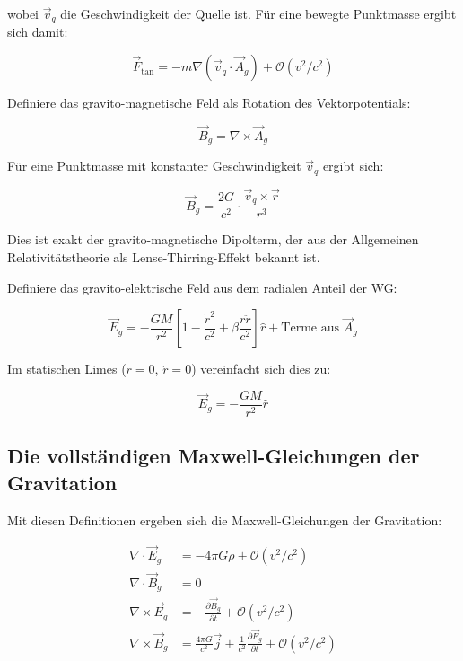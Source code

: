 \documentclass[12pt,a4paper]{article}
\begin{document}
wobei $\vec{v}_q$ die Geschwindigkeit der Quelle ist. Für eine bewegte Punktmasse ergibt sich damit:

\begin{equation}
\vec{F}_{\text{tan}} = -m \nabla (\vec{v}_q \cdot \vec{A}_g) + \mathcal{O}(v^2/c^2)
\end{equation}

Definiere das gravito-magnetische Feld als Rotation des Vektorpotentials:

\begin{equation}
\vec{B}_g = \nabla \times \vec{A}_g
\end{equation}

Für eine Punktmasse mit konstanter Geschwindigkeit $\vec{v}_q$ ergibt sich:

\begin{equation}
\vec{B}_g = \frac{2G}{c^2} \cdot \frac{\vec{v}_q \times \vec{r}}{r^3}
\end{equation}

Dies ist exakt der gravito-magnetische Dipolterm, der aus der Allgemeinen Relativitätstheorie als Lense-Thirring-Effekt bekannt ist.

Definiere das gravito-elektrische Feld aus dem radialen Anteil der WG:

\begin{equation}
\vec{E}_g = -\frac{GM}{r^2} \left[ 1 - \frac{\dot{r}^2}{c^2} + \beta \frac{r \ddot{r}}{c^2} \right] \hat{r} + \text{Terme aus } \vec{A}_g
\end{equation}

Im statischen Limes ($\dot{r} = 0$, $\ddot{r} = 0$) vereinfacht sich dies zu:

\begin{equation}
\vec{E}_g = -\frac{GM}{r^2} \hat{r}
\end{equation}

\subsection{Die vollständigen Maxwell-Gleichungen der Gravitation}

Mit diesen Definitionen ergeben sich die Maxwell-Gleichungen der Gravitation:

\begin{align}
\nabla \cdot \vec{E}_g &= -4\pi G\rho + \mathcal{O}(v^2/c^2) \\
\nabla \cdot \vec{B}_g &= 0 \\
\nabla \times \vec{E}_g &= -\frac{\partial \vec{B}_g}{\partial t} + \mathcal{O}(v^2/c^2) \\
\nabla \times \vec{B}_g &= \frac{4\pi G}{c^2} \vec{j} + \frac{1}{c^2} \frac{\partial \vec{E}_g}{\partial t} + \mathcal{O}(v^2/c^2)
\end{align}
\end{document}

